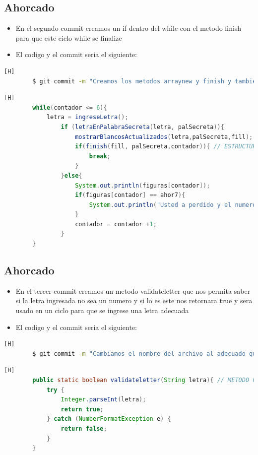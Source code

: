 \documentclass{article}
\begin{document}
	\subsection{Ahorcado}
	\begin{itemize}	
		\item En el segundo commit creamos un if dentro del while con el metodo finish para que este ciclo while se finalize
		\item El codigo y el commit seria el siguiente:
	\end{itemize}
	\begin{lstlisting}[language=bash,caption={Commit}][H]
		$ git commit -m "Creamos los metodos arraynew y finish y tambien ponemos una estructura de control en el ciclo while que nos servira como un indicador que si se esta llegando a igualar estas 2 arrays para su posterior finalizacion con un break"
	\end{lstlisting}
	\begin{lstlisting}[language=java,caption={Las lineas de codigo de lo creado:}][H]
        while(contador <= 6){
            letra = ingreseLetra();
                if (letraEnPalabraSecreta(letra, palSecreta)){
                    mostrarBlancosActualizados(letra,palSecreta,fill);
                    if(finish(fill, palSecreta,contador)){ // ESTRUCTURA DE CONTROL USADA Y TAMBIEN EL METODO CREADO QUE ES FINISH
                        break;
                    }
                }else{
                    System.out.println(figuras[contador]);
                    if(figuras[contador] == ahor7){
                        System.out.println("Usted a perdido y el numero de intentos es : " + contador); // MENSAJE DE PERDIO Y CUANTOS INTENTOS USO 
                    }
                    contador = contador +1;
                }
        }
	\end{lstlisting}
	\subsection{Ahorcado}
	\begin{itemize}	
		\item En el tercer commit creamos un metodo validateletter que nos permita saber si la letra ingresada no sea un numero y si lo es este nos retornara true y sera usado en un ciclo para que se ingrese una letra adecuada
		\item El codigo y el commit seria el siguiente:
	\end{itemize}
	\begin{lstlisting}[language=bash,caption={Commit}][H]
		$ git commit -m "Cambiamos el nombre del archivo al adecuado que es Ahorcado y tambien anadimos un metodo validateletter y completamos el metodo ingreseletra"
	\end{lstlisting}
	\begin{lstlisting}[language=java,caption={Las lineas de codigo de lo creado:}][H]
		public static boolean validateletter(String letra){ // METODO CREADO PARA EL INGRESO DE UNA LETRA PARA SU COMPROBACION SI ES UN NUMERO NOS DARA TRUE Y SI NO FALSE
			try {
				Integer.parseInt(letra);
				return true;
			} catch (NumberFormatException e) {
				return false;
			}
		}
	\end{lstlisting}
\end{document}
